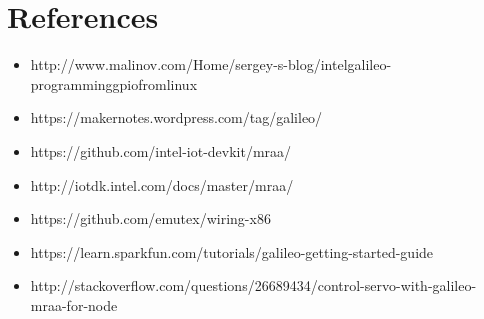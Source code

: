 \documentclass[11pt,a4paper]{article}
\begin{document}
\section{References}
\begin{itemize}
\item	http://www.malinov.com/Home/sergey-s-blog/intelgalileo-programminggpiofromlinux
\item	https://makernotes.wordpress.com/tag/galileo/
\item	https://github.com/intel-iot-devkit/mraa/
\item	http://iotdk.intel.com/docs/master/mraa/
\item	https://github.com/emutex/wiring-x86
\item	https://learn.sparkfun.com/tutorials/galileo-getting-started-guide
\item	http://stackoverflow.com/questions/26689434/control-servo-with-galileo-mraa-for-node

\end{itemize}
\end{document}
